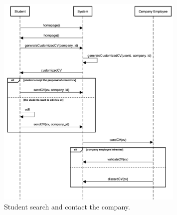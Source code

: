     \begin{figure}[H]
        \centering
        \includegraphics[width=0.8\textwidth]{RASD/Assets/SequenceDiagrams/3-student-contact-company.png}
        \caption{Student search and contact the company.}
        \label{fig:Student search and contact the company}
    \end{figure}
    

